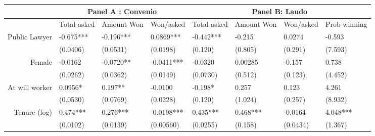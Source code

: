 \begin{tabular}{rrrrrrrr}
\toprule
      & \multicolumn{3}{c}{Panel A : Convenio} & \multicolumn{4}{c}{Panel B: Laudo} \\
\midrule
      & \multicolumn{1}{c}{Total asked} & \multicolumn{1}{c}{Amount Won} & \multicolumn{1}{c}{Won/asked} & \multicolumn{1}{c}{Total asked} & \multicolumn{1}{c}{Amount Won} & \multicolumn{1}{c}{Won/asked} & \multicolumn{1}{c}{Prob winning} \\
      \midrule
Public Lawyer & \multicolumn{1}{l}{-0.675***} & \multicolumn{1}{l}{-0.196***} & \multicolumn{1}{l}{0.0869***} & \multicolumn{1}{l}{-0.442***} & \multicolumn{1}{l}{-0.215} & \multicolumn{1}{l}{0.0274} & \multicolumn{1}{l}{-0.593} \\
      & \multicolumn{1}{l}{(0.0406)} & \multicolumn{1}{l}{(0.0531)} & \multicolumn{1}{l}{(0.0198)} & \multicolumn{1}{l}{(0.120)} & \multicolumn{1}{l}{(0.805)} & \multicolumn{1}{l}{(0.291)} & \multicolumn{1}{l}{(7.593)} \\
Female & \multicolumn{1}{l}{-0.0162} & \multicolumn{1}{l}{-0.0720**} & \multicolumn{1}{l}{-0.0411***} & \multicolumn{1}{l}{-0.0320} & \multicolumn{1}{l}{0.00285} & \multicolumn{1}{l}{-0.157} & \multicolumn{1}{l}{0.738} \\
      & \multicolumn{1}{l}{(0.0262)} & \multicolumn{1}{l}{(0.0362)} & \multicolumn{1}{l}{(0.0149)} & \multicolumn{1}{l}{(0.0730)} & \multicolumn{1}{l}{(0.512)} & \multicolumn{1}{l}{(0.123)} & \multicolumn{1}{l}{(4.452)} \\
At will worker & \multicolumn{1}{l}{0.0956*} & \multicolumn{1}{l}{0.197**} & \multicolumn{1}{l}{-0.0100} & \multicolumn{1}{l}{-0.198*} & \multicolumn{1}{l}{0.257} & \multicolumn{1}{l}{0.123} & \multicolumn{1}{l}{4.261} \\
      & \multicolumn{1}{l}{(0.0530)} & \multicolumn{1}{l}{(0.0769)} & \multicolumn{1}{l}{(0.0228)} & \multicolumn{1}{l}{(0.120)} & \multicolumn{1}{l}{(1.024)} & \multicolumn{1}{l}{(0.257)} & \multicolumn{1}{l}{(8.932)} \\
Tenure (log) & \multicolumn{1}{l}{0.474***} & \multicolumn{1}{l}{0.276***} & \multicolumn{1}{l}{-0.0198***} & \multicolumn{1}{l}{0.435***} & \multicolumn{1}{l}{0.468***} & \multicolumn{1}{l}{-0.0164} & \multicolumn{1}{l}{4.048***} \\
      & \multicolumn{1}{l}{(0.0102)} & \multicolumn{1}{l}{(0.0139)} & \multicolumn{1}{l}{(0.00560)} & \multicolumn{1}{l}{(0.0255)} & \multicolumn{1}{l}{(0.158)} & \multicolumn{1}{l}{(0.0434)} & \multicolumn{1}{l}{(1.367)} \\

\end{tabular}
